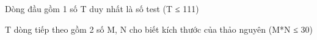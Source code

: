 Dòng đầu gồm 1 số T duy nhất là số test (T ≤ 111)  

   T dòng tiếp theo gồm 2 số M, N cho biết kích thước của thảo nguyên (M*N ≤ 30)  

\